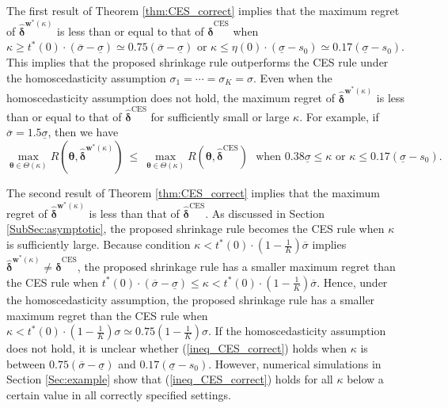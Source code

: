 \documentclass[12pt,a4paper]{article}
\begin{document}
The first result of Theorem \ref{thm:CES_correct} implies that the maximum regret of $\hat{\bm{\delta}}^{\bm{w}^{\ast}(\kappa)}$ is less than or equal to that of $\hat{\bm{\delta}}^{\mathrm{CES}}$ when $\kappa \geq t^{\ast}(0) \cdot (\overline{\sigma} - \underline{\sigma}) \simeq 0.75 (\overline{\sigma} - \underline{\sigma})$ or $\kappa \leq  \eta(0) \cdot ( \underline{\sigma} - s_0 ) \simeq  0.17 ( \underline{\sigma} - s_0 )$. This implies that the proposed shrinkage rule outperforms the CES rule under the homoscedasticity assumption $\sigma_1 = \cdots = \sigma_K = \sigma$. Even when the homoscedasticity assumption does not hold, the maximum regret of $\hat{\bm{\delta}}^{\bm{w}^{\ast}(\kappa)}$ is less than or equal to that of $\hat{\bm{\delta}}^{\mathrm{CES}}$ for sufficiently small or large $\kappa$. For example, if $\overline{\sigma} = 1.5  \underline{\sigma}$, then we have
\[
\max_{\bm{\theta} \in \Theta(\kappa)} R(\bm{\theta},\hat{\bm{\delta}}^{\bm{w}^{\ast}(\kappa)}) \ \leq \ \max_{\bm{\theta} \in \Theta(\kappa)} R(\bm{\theta},\hat{\bm{\delta}}^{\mathrm{CES}}) \ \ \ \text{when $0.38 \underline{\sigma} \leq \kappa$ or $\kappa \leq 0.17 (\underline{\sigma} - s_0)$.}
\] 

The second result of Theorem \ref{thm:CES_correct} implies that the maximum regret of $\hat{\bm{\delta}}^{\bm{w}^{\ast}(\kappa)}$ is less than that of $\hat{\bm{\delta}}^{\mathrm{CES}}$. As discussed in Section \ref{SubSec:asymptotic}, the proposed shrinkage rule becomes the CES rule when $\kappa$ is sufficiently large. Because condition $\kappa < t^{\ast}(0) \cdot \left( 1-\frac{1}{K} \right) \overline{\sigma}$ implies $\hat{\bm{\delta}}^{\bm{w}^{\ast}(\kappa)} \neq \hat{\bm{\delta}}^{\mathrm{CES}}$, the proposed shrinkage rule has a smaller maximum regret than the CES rule when $t^{\ast}(0) \cdot (\overline{\sigma} - \underline{\sigma}) \leq \kappa < t^{\ast}(0) \cdot \left( 1-\frac{1}{K} \right) \overline{\sigma}$. Hence, under the homoscedasticity assumption, the proposed shrinkage rule has a smaller maximum regret than the CES rule when $\kappa < t^{\ast}(0) \cdot \left( 1-\frac{1}{K} \right) \sigma \simeq 0.75 \left( 1-\frac{1}{K} \right) \sigma$. If the homoscedasticity assumption does not hold, it is unclear whether (\ref{ineq_CES_correct}) holds when $\kappa$ is between $0.75(\overline{\sigma} - \underline{\sigma})$ and $0.17(\underline{\sigma} - s_0)$. However, numerical simulations in Section \ref{Sec:example} show that (\ref{ineq_CES_correct}) holds for all $\kappa$ below a certain value in all correctly specified settings.
\end{document}
